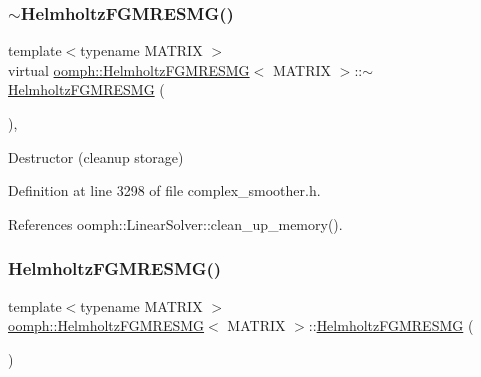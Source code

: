 \subsubsection{\texorpdfstring{$\sim$\+Helmholtz\+F\+G\+M\+R\+E\+S\+M\+G()}{~HelmholtzFGMRESMG()}}
{\footnotesize\ttfamily template$<$typename M\+A\+T\+R\+IX $>$ \\
virtual \hyperlink{classoomph_1_1HelmholtzFGMRESMG}{oomph\+::\+Helmholtz\+F\+G\+M\+R\+E\+S\+MG}$<$ M\+A\+T\+R\+IX $>$\+::$\sim$\hyperlink{classoomph_1_1HelmholtzFGMRESMG}{Helmholtz\+F\+G\+M\+R\+E\+S\+MG} (\begin{DoxyParamCaption}{ }\end{DoxyParamCaption})\hspace{0.3cm}{\ttfamily [inline]}, {\ttfamily [virtual]}}



Destructor (cleanup storage) 



Definition at line 3298 of file complex\+\_\+smoother.\+h.



References oomph\+::\+Linear\+Solver\+::clean\+\_\+up\+\_\+memory().

\mbox{\label{classoomph_1_1HelmholtzFGMRESMG_af6066d4a36010eab35396919566058c3}} 
\subsubsection{\texorpdfstring{Helmholtz\+F\+G\+M\+R\+E\+S\+M\+G()}{HelmholtzFGMRESMG()}\hspace{0.1cm}{\footnotesize\ttfamily [2/2]}}
{\footnotesize\ttfamily template$<$typename M\+A\+T\+R\+IX $>$ \\
\hyperlink{classoomph_1_1HelmholtzFGMRESMG}{oomph\+::\+Helmholtz\+F\+G\+M\+R\+E\+S\+MG}$<$ M\+A\+T\+R\+IX $>$\+::\hyperlink{classoomph_1_1HelmholtzFGMRESMG}{Helmholtz\+F\+G\+M\+R\+E\+S\+MG} (\begin{DoxyParamCaption}\item[{const \hyperlink{classoomph_1_1HelmholtzFGMRESMG}{Helmholtz\+F\+G\+M\+R\+E\+S\+MG}$<$ M\+A\+T\+R\+IX $>$ \&}]{ }\end{DoxyParamCaption})\hspace{0.3cm}{\ttfamily [inline]}}



